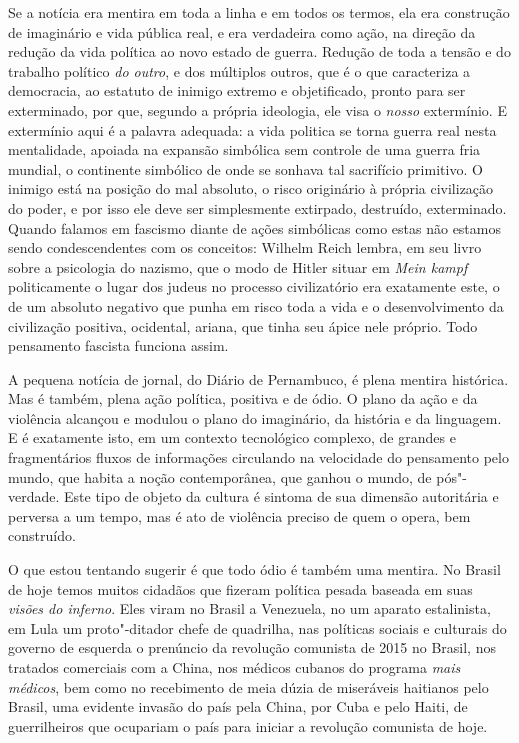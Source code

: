 Se a notícia era mentira em toda a linha e em todos os termos, ela era
construção de imaginário e vida pública real, e era verdadeira como
ação, na direção da redução da vida política ao novo estado de guerra.
Redução de toda a tensão e do trabalho político \emph{do outro}, e dos
múltiplos outros, que é o que caracteriza a democracia, ao estatuto de
inimigo extremo e objetificado, pronto para ser exterminado, por que,
segundo a própria ideologia, ele visa o \emph{nosso} extermínio. E
extermínio aqui é a palavra adequada: a vida politica se torna guerra
real nesta mentalidade, apoiada na expansão simbólica sem controle de
uma guerra fria mundial, o continente simbólico de onde se sonhava tal
sacrifício primitivo. O inimigo está na posição do mal absoluto, o risco
originário à própria civilização do poder, e por isso ele deve ser
simplesmente extirpado, destruído, exterminado. Quando falamos em
fascismo diante de ações simbólicas como estas não estamos sendo
condescendentes com os conceitos: Wilhelm Reich lembra, em seu livro
sobre a psicologia do nazismo, que o modo de Hitler situar em \emph{Mein
kampf} politicamente o lugar dos judeus no processo civilizatório era
exatamente este, o de um absoluto negativo que punha em risco toda a
vida e o desenvolvimento da civilização positiva, ocidental, ariana, que
tinha seu ápice nele próprio. Todo pensamento fascista funciona assim.

A pequena notícia de jornal, do Diário de Pernambuco, é plena mentira
histórica. Mas é também, plena ação política, positiva e de ódio. O
plano da ação e da violência alcançou e modulou o plano do imaginário,
da história e da linguagem. E é exatamente isto, em um contexto
tecnológico complexo, de grandes e fragmentários fluxos de informações
circulando na velocidade do pensamento pelo mundo, que habita a noção
contemporânea, que ganhou o mundo, de pós"-verdade. Este tipo de objeto
da cultura é sintoma de sua dimensão autoritária e perversa a um tempo,
mas é ato de violência preciso de quem o opera, bem construído.

O que estou tentando sugerir é que todo ódio é também uma mentira. No
Brasil de hoje temos muitos cidadãos que fizeram política pesada baseada
em suas \emph{visões do inferno}. Eles viram no Brasil a Venezuela, no
 um aparato estalinista, em Lula um proto"-ditador chefe de quadrilha,
nas políticas sociais e culturais do governo de esquerda o prenúncio da
revolução comunista de 2015 no Brasil, nos tratados comerciais com a
China, nos médicos cubanos do programa \emph{mais médicos}, bem como no
recebimento de meia dúzia de miseráveis haitianos pelo Brasil, uma
evidente invasão do país pela China, por Cuba e pelo Haiti, de
guerrilheiros que ocupariam o país para iniciar a revolução comunista de
hoje.

